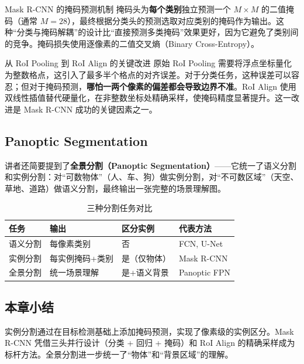 \documentclass[a4paper]{article}
\begin{document}
\begin{importantbox}{Mask R-CNN 的掩码预测机制}
掩码头为\textbf{每个类别}独立预测一个 $M \times M$ 的二值掩码（通常 $M=28$），最终根据分类头的预测选取对应类别的掩码作为输出。这种``分类与掩码解耦''的设计比``直接预测多类掩码''效果更好，因为它避免了类别间的竞争。掩码损失使用逐像素的二值交叉熵（Binary Cross-Entropy）。
\end{importantbox}

\begin{knowledgebox}{从 RoI Pooling 到 RoI Align 的关键改进}
原始 RoI Pooling 需要将浮点坐标量化为整数格点，这引入了最多半个格点的对齐误差。对于分类任务，这种误差可以容忍；但对于掩码预测，\textbf{哪怕一两个像素的偏差都会导致边界不准}。RoI Align 使用双线性插值替代硬量化，在非整数坐标处精确采样，使掩码精度显著提升。这一改进是 Mask R-CNN 成功的关键因素之一。
\end{knowledgebox}

\subsection{Panoptic Segmentation}

讲者还简要提到了\textbf{全景分割（Panoptic Segmentation）}——它统一了语义分割和实例分割：对``可数物体''（人、车、狗）做实例分割，对``不可数区域''（天空、草地、道路）做语义分割，最终输出一张完整的场景理解图。

\begin{table}[H]
\centering
\begin{tabular}{p{3cm}p{3.5cm}p{3.5cm}p{3cm}}
\toprule
\textbf{任务} & \textbf{输出} & \textbf{区分实例} & \textbf{代表方法} \\
\midrule
语义分割 & 每像素类别 & 否 & FCN, U-Net \\
实例分割 & 每实例掩码+类别 & 是（仅物体） & Mask R-CNN \\
全景分割 & 统一场景理解 & 是+语义背景 & Panoptic FPN \\
\bottomrule
\end{tabular}
\caption{三种分割任务对比}
\end{table}

\subsection{本章小结}

实例分割通过在目标检测基础上添加掩码预测，实现了像素级的实例区分。Mask R-CNN 凭借三头并行设计（分类 + 回归 + 掩码）和 RoI Align 的精确采样成为标杆方法。全景分割进一步统一了``物体''和``背景区域''的理解。
\end{document}
